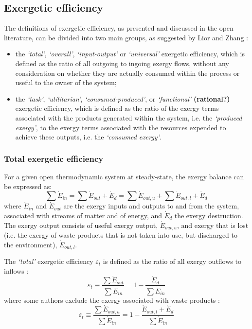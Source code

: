 
\subsection{Exergetic efficiency}

The definitions of exergetic efficiency, as presented and discussed in the open literature, can be divided into two main groups, as suggested by Lior and Zhang \cite{Lior2007}:

\begin{itemize}
	\item the \emph{`total'}, \emph{`overall'}, \emph{`input-output'} or \emph{`universal'} exergetic efficiency, which is defined as the ratio of all outgoing to ingoing exergy flows, without any consideration on whether they are actually consumed within the process or useful to the owner of the system;
	\item the \emph{`task'}, \emph{`utilitarian'}, \emph{`consumed-produced'}, or \emph{`functional'} \textbf{(rational?)} exergetic efficiency, which is defined as the ratio of the exergy terms associated with the products generated within the system, i.e. the \emph{`produced exergy'}, to the exergy terms associated with the resources expended to achieve these outputs, i.e. the \emph{`consumed exergy'}.
\end{itemize}

\subsubsection{Total exergetic efficiency}

For a given open thermodynamic system at steady-state, the exergy balance can be expressed as:
\begin{equation}
	\sum \dot{E}_{in} = \sum \dot{E}_{out}+\dot{E}_d = \sum \dot{E}_{out,u} + \sum \dot{E}_{out,l} + \dot{E}_d
\end{equation}
where $\dot{E}_{in}$ and $\dot{E}_{out}$ are the exergy inputs and outputs to and from the system, associated with streams of matter and of energy, and $\dot{E}_d$ the exergy destruction. The exergy output consists of useful exergy output, $\dot{E}_{out,u}$, and exergy that is lost (i.e. the exergy of waste products that is not taken into use, but discharged to the environment), $\dot{E}_{out,l}$.

The \emph{`total'} exergetic efficiency $\varepsilon_t$ is defined as the ratio of all exergy outflows to inflows \cite{Cornelissen1997,Lior2007,Wall2004}:
\begin{equation}
	\varepsilon_t \equiv \frac{\sum \dot{E}_{out}}{\sum \dot{E}_{in}} = 1-\frac{\dot{E}_d}{\sum \dot{E}_{in}}
\end{equation}
where some authors exclude the exergy associated with waste products \cite{Fratzscher1986,Wall2004}:
\begin{equation}
	\varepsilon_t \equiv \frac{\sum \dot{E}_{out,u}}{\sum \dot{E}_{in}} = 1-\frac{\dot{E}_{out,l}+\dot{E}_d}{\sum \dot{E}_{in}}
\end{equation} 

